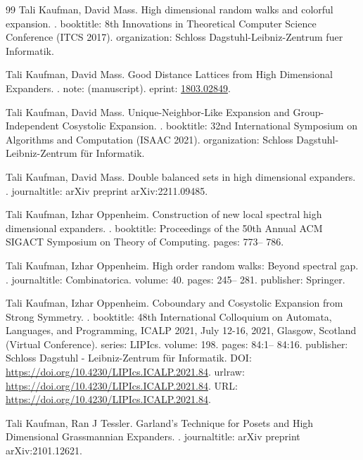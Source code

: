 \documentclass[10pt,a4paper]{article}
\theoremstyle{definition}
\theoremstyle{remark}
\numberwithin{equation}{section}
\begin{document}
\begin{thebibliography}{99}
Tali Kaufman, David Mass.
\newblock High dimensional random walks and colorful expansion.
.
\newblock booktitle: 8th Innovations in Theoretical Computer Science Conference (ITCS 2017).
\newblock organization: Schloss Dagstuhl-Leibniz-Zentrum fuer Informatik.

Tali Kaufman, David Mass.
\newblock Good Distance Lattices from High Dimensional Expanders.
.
\newblock note: (manuscript).
\newblock eprint: \url{1803.02849}.

Tali Kaufman, David Mass.
\newblock Unique-Neighbor-Like Expansion and Group-Independent Cosystolic Expansion.
.
\newblock booktitle: 32nd International Symposium on Algorithms and Computation (ISAAC 2021).
\newblock organization: Schloss Dagstuhl-Leibniz-Zentrum für Informatik.

Tali Kaufman, David Mass.
\newblock Double balanced sets in high dimensional expanders.
.
\newblock journaltitle: arXiv preprint arXiv:2211.09485.

Tali Kaufman, Izhar Oppenheim.
\newblock Construction of new local spectral high dimensional expanders.
.
\newblock booktitle: Proceedings of the 50th Annual ACM SIGACT Symposium on Theory of Computing.
\newblock pages: 773-- 786.

Tali Kaufman, Izhar Oppenheim.
\newblock High order random walks: Beyond spectral gap.
.
\newblock journaltitle: Combinatorica.
\newblock volume: 40.
\newblock pages: 245-- 281.
\newblock publisher: Springer.

Tali Kaufman, Izhar Oppenheim.
\newblock Coboundary and Cosystolic Expansion from Strong Symmetry.
.
\newblock booktitle: 48th International Colloquium on Automata, Languages, and Programming, {ICALP} 2021, July 12-16, 2021, Glasgow, Scotland (Virtual Conference).
\newblock series: LIPIcs.
\newblock volume: 198.
\newblock pages: 84:1-- 84:16.
\newblock publisher: Schloss Dagstuhl - Leibniz-Zentrum für Informatik.
\newblock DOI: \url{https://doi.org/10.4230/LIPIcs.ICALP.2021.84}.
\newblock urlraw: \url{https://doi.org/10.4230/LIPIcs.ICALP.2021.84}.
\newblock URL: \url{https://doi.org/10.4230/LIPIcs.ICALP.2021.84}.

Tali Kaufman, Ran J Tessler.
\newblock Garland's Technique for Posets and High Dimensional Grassmannian Expanders.
.
\newblock journaltitle: arXiv preprint arXiv:2101.12621.


\end{thebibliography}
\end{document}
